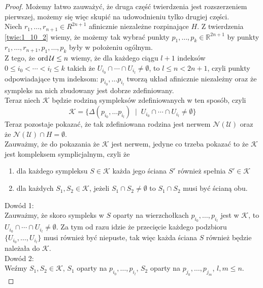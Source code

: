 \begin{proof}
    Możemy łatwo zauważyć, że druga część twierdzenia jest rozszerzeniem pierwszej, możemy się więc skupić na udowodnieniu tylko drugiej części.\\
    Niech $r_1, \ldots, r_{n+1}\in R^{2n+1}$ afinicznie niezależne rozpinające $H$.
    Z twierdzenia \ref{twie:1_10_2} wiemy, że możemy tak wybrać punkty $p_1, \ldots, p_k\in \mathbb{R}^{2n+1}$ by punkty $r_1, \ldots, r_{n+1}, p_1,\ldots, p_k $ były w położeniu ogólnym. \\
    Z tego, że $\operatorname{ord} \mathcal{U}\le n$ wiemy, że dla każdego ciągu $l+1$ indeksów $0\le i_0< \cdots < i_l\le k$ takich że $U_{i_0}\cap\cdots \cap U_{i_l}\ne \emptyset$, to $l\le n<2n+1$, czyli punkty odpowiadające tym indeksom: $p_{i_0},\ldots p_{i_l}$ tworzą układ afinicznie niezależny oraz że sympleks na nich zbudowany jest dobrze zdefiniowany. \\
    Teraz niech $\mathcal{K}$ będzie rodziną sympleksów 
    zdefiniowanych w ten sposób, czyli 
    \[
    \mathcal{K} = 
    \{
        \Delta (p_{i_0},\ldots p_{i_l})\;\; | \;\; U_{i_0}\cap\cdots \cap U_{i_l}\ne \emptyset
    \}
    \]
    Teraz pozostaje pokazać, że tak zdefiniowana rodzina jest nerwem $\mathcal{N(U)}$ oraz że $\mathcal{N(U)}\cap H=\emptyset$.\\
    Zauważmy, że do pokazania że $\mathcal{K}$ jest nerwem, jedyne co trzeba pokazać to że $\mathcal{K}$ jest kompleksem symplicjalnym, czyli że 
    \begin{enumerate}
        \item dla każdego sympleksu $S\in \mathcal{K}$ każda jego ściana $S'$ również spełnia $S'\in \mathcal{K}$
        \item dla każdych $S_1, S_2\in \mathcal{K}$, jeżeli $S_1\cap S_2\ne \emptyset$ to $S_1\cap S_2$ musi być ścianą obu.
    \end{enumerate}
    Dowód 1:\\
    Zauważmy, że skoro sympleks w $S$ oparty na wierzchołkach $p_{i_0}, \ldots, p_{i_l}$ jest w $\mathcal{K}$, to $U_{i_0}\cap\cdots\cap U_{i_l}\ne \emptyset$. Za tym od razu idzie że przecięcie każdego podzbioru $\{ U_{i_0}, \ldots, U_{i_l}\}$ musi również być niepuste, tak więc każda ściana $S$ również będzie należała do $\mathcal{K}$.
    \\
    Dowód 2:\\
    Weźmy $S_1, S_2\in \mathcal{K}$, $S_1$ oparty na $p_{i_0}, \ldots, p_{i_l}$, $S_2$ oparty na $p_{j_0}, \ldots, p_{j_m}$, $l, m\le n$.\\

\end{proof}
